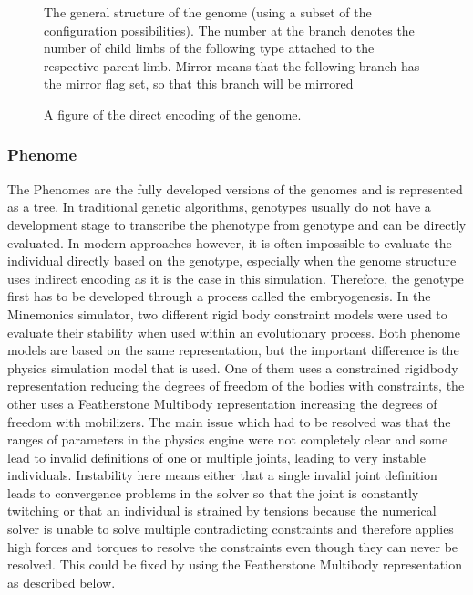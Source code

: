 \documentclass[main]{subfiles}
\begin{document}
\begin{figure}[H]
\center


\caption[Possible indirectly encoded genome]{The general structure of the genome (using a subset of the configuration possibilities). The number at the branch denotes the number of child limbs of the following type attached to the respective parent limb. Mirror means that the following branch has the mirror flag set, so that this branch will be mirrored}
\label{figure:indirect-genotype}
\end{figure}

\begin{figure}[H]
\centering


\caption[Directly encoded genome]{A figure of the direct encoding of the genome.}
\label{figure:direct-encoding}
\end{figure}

\subsubsection{Phenome}

The Phenomes are the fully developed versions of the genomes and is represented as a tree. In traditional genetic algorithms, genotypes usually do not have a development stage to transcribe the phenotype from genotype and can be directly evaluated. In modern approaches however, it is often impossible to evaluate the individual directly based on the genotype, especially when the genome structure uses indirect encoding as it is the case in this simulation. Therefore, the genotype first has to be developed through a process called the embryogenesis.
In the Minemonics simulator, two different rigid body constraint models were used to evaluate their stability when used within an evolutionary process. Both phenome models are based on the same representation, but the important difference is the physics simulation model that is used. One of them uses a constrained rigidbody representation reducing the degrees of freedom of the bodies with constraints, the other uses a Featherstone Multibody representation increasing the degrees of freedom with mobilizers. The main issue which had to be resolved was that the ranges of parameters in the physics engine were not completely clear and some lead to invalid definitions of one or multiple joints, leading to very instable individuals. Instability here means either that a single invalid joint definition leads to convergence problems in the solver so that the joint is constantly twitching or that an individual is strained by tensions because the numerical solver is unable to solve multiple contradicting constraints and therefore applies high forces and torques to resolve the constraints even though they can never be resolved. This could be fixed by using the Featherstone Multibody representation as described below. 
\end{document}
